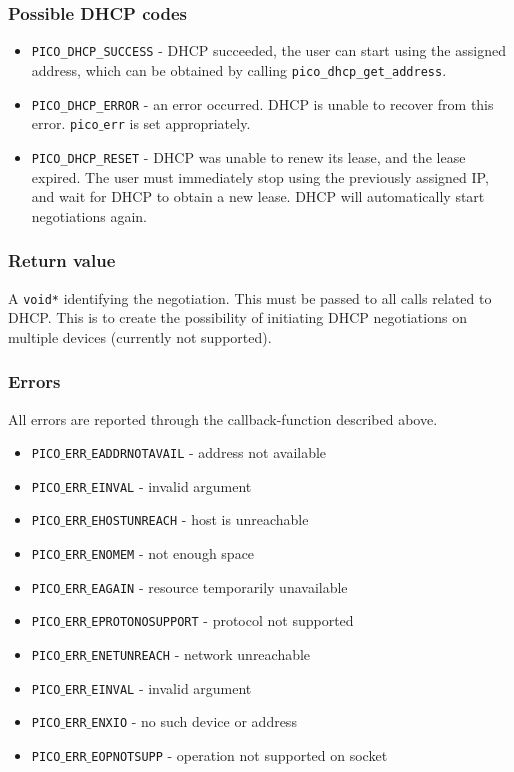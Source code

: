 \subsubsection*{Possible DHCP codes}
\begin{itemize}[noitemsep]
\item \texttt{PICO\_DHCP\_SUCCESS} - DHCP succeeded, the user can start using the assigned address,
which can be obtained by calling \texttt{pico\_dhcp\_get\_address}.
\item \texttt{PICO\_DHCP\_ERROR} - an error occurred. DHCP is unable to recover from this error.
\texttt{pico$\_$err} is set appropriately.
\item \texttt{PICO\_DHCP\_RESET} - DHCP was unable to renew its lease, and the lease expired.
The user must immediately stop using the previously assigned IP, and wait for DHCP to obtain a
new lease. DHCP will automatically start negotiations again.
\end{itemize}

\subsubsection*{Return value}
A \texttt{void*} identifying the negotiation. This must be passed to all calls related to DHCP.
This is to create the possibility of initiating DHCP negotiations on multiple devices (currently not supported).

\subsubsection*{Errors}   %
All errors are reported through the callback-function described above.
\begin{itemize}[noitemsep]
\item \texttt{PICO$\_$ERR$\_$EADDRNOTAVAIL} - address not available		%
\item \texttt{PICO$\_$ERR$\_$EINVAL} - invalid argument
\item \texttt{PICO$\_$ERR$\_$EHOSTUNREACH} - host is unreachable
\item \texttt{PICO$\_$ERR$\_$ENOMEM} - not enough space
\item \texttt{PICO$\_$ERR$\_$EAGAIN} - resource temporarily unavailable
\item \texttt{PICO$\_$ERR$\_$EPROTONOSUPPORT} - protocol not supported	%
\item \texttt{PICO$\_$ERR$\_$ENETUNREACH} - network unreachable 
\item \texttt{PICO$\_$ERR$\_$EINVAL} - invalid argument					%
\item \texttt{PICO$\_$ERR$\_$ENXIO} - no such device or address
\item \texttt{PICO$\_$ERR$\_$EOPNOTSUPP} - operation not supported on socket
\end{itemize}

